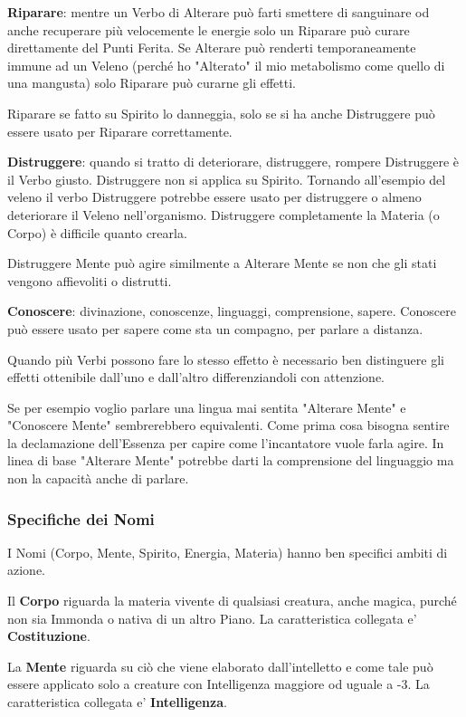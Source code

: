 \documentclass[a4paper,twoside,openany]{book}
\begin{document}
\begin{multicols}{2}
\textbf{Riparare}: mentre un Verbo di Alterare può farti smettere di sanguinare od anche recuperare più velocemente le energie solo un Riparare può curare direttamente del Punti Ferita. Se Alterare può renderti temporaneamente immune ad un Veleno (perché ho "Alterato" il mio metabolismo come quello di una mangusta) solo Riparare può curarne gli effetti.

Riparare se fatto su Spirito lo danneggia, solo se si ha anche Distruggere può essere usato per Riparare correttamente.

\textbf{Distruggere}: quando si tratto di deteriorare, distruggere, rompere Distruggere è il Verbo giusto. Distruggere non si applica su Spirito.
Tornando all'esempio del veleno il verbo Distruggere potrebbe essere usato per distruggere o almeno deteriorare il Veleno nell'organismo. Distruggere completamente la Materia (o Corpo) è difficile quanto crearla.

Distruggere Mente può agire similmente a Alterare Mente se non che gli stati vengono affievoliti o distrutti.

\textbf{Conoscere}: divinazione, conoscenze, linguaggi, comprensione, sapere. Conoscere può essere usato per sapere come sta un compagno, per parlare a distanza.

Quando più Verbi possono fare lo stesso effetto è necessario ben distinguere gli effetti ottenibile dall'uno e dall'altro differenziandoli con attenzione.

Se per esempio voglio parlare una lingua mai sentita "Alterare Mente" e "Conoscere Mente" sembrerebbero equivalenti.
Come prima cosa bisogna sentire la declamazione dell'Essenza per capire come l'incantatore vuole farla agire. In linea di base "Alterare Mente" potrebbe darti la comprensione del linguaggio ma non la capacità anche di parlare.


\subsubsection{Specifiche dei Nomi}

\label{Specifiche dei Nomi}

I Nomi (Corpo, Mente, Spirito, Energia, Materia) hanno ben specifici ambiti di azione.

Il \textbf{Corpo} riguarda la materia vivente di qualsiasi creatura, anche magica, purché non sia Immonda o nativa di un altro Piano. La caratteristica collegata e' \textbf{Costituzione}.

La \textbf{Mente} riguarda su ciò che viene elaborato dall'intelletto e come tale può essere applicato solo a creature con Intelligenza maggiore od uguale a -3. La caratteristica collegata e' \textbf{Intelligenza}.


\end{multicols}
\end{document}
